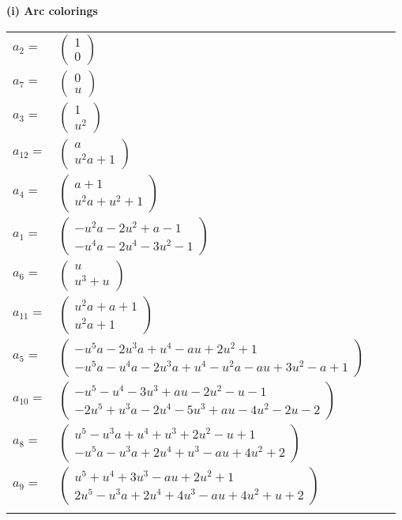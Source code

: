 \documentclass[1p]{elsarticle_modified}
\theoremstyle{definition}
\begin{document}
\flushleft \textbf{(i) Arc colorings}\\
\begin{tabular}{m{7pt} m{180pt} m{7pt} m{180pt} }
\flushright $a_{2}=$&$\begin{pmatrix}1\\0\end{pmatrix}$ \\
\flushright $a_{7}=$&$\begin{pmatrix}0\\u\end{pmatrix}$ \\
\flushright $a_{3}=$&$\begin{pmatrix}1\\u^2\end{pmatrix}$ \\
\flushright $a_{12}=$&$\begin{pmatrix}a\\u^2 a+1\end{pmatrix}$ \\
\flushright $a_{4}=$&$\begin{pmatrix}a+1\\u^2 a+u^2+1\end{pmatrix}$ \\
\flushright $a_{1}=$&$\begin{pmatrix}- u^2 a-2 u^2+a-1\\- u^4 a-2 u^4-3 u^2-1\end{pmatrix}$ \\
\flushright $a_{6}=$&$\begin{pmatrix}u\\u^3+u\end{pmatrix}$ \\
\flushright $a_{11}=$&$\begin{pmatrix}u^2 a+a+1\\u^2 a+1\end{pmatrix}$ \\
\flushright $a_{5}=$&$\begin{pmatrix}- u^5 a-2 u^3 a+u^4- a u+2 u^2+1\\- u^5 a- u^4 a-2 u^3 a+u^4- u^2 a- a u+3 u^2- a+1\end{pmatrix}$ \\
\flushright $a_{10}=$&$\begin{pmatrix}- u^5- u^4-3 u^3+a u-2 u^2- u-1\\-2 u^5+u^3 a-2 u^4-5 u^3+a u-4 u^2-2 u-2\end{pmatrix}$ \\
\flushright $a_{8}=$&$\begin{pmatrix}u^5- u^3 a+u^4+u^3+2 u^2- u+1\\- u^5 a- u^3 a+2 u^4+u^3- a u+4 u^2+2\end{pmatrix}$ \\
\flushright $a_{9}=$&$\begin{pmatrix}u^5+u^4+3 u^3- a u+2 u^2+1\\2 u^5- u^3 a+2 u^4+4 u^3- a u+4 u^2+u+2\end{pmatrix}$\\&\end{tabular}
\end{document}
